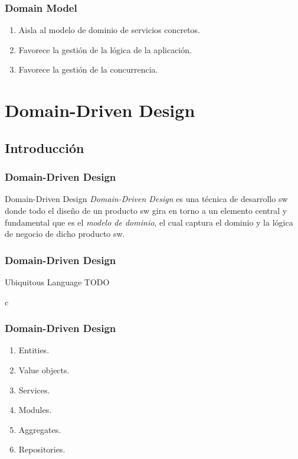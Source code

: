\documentclass[a4paper,slidestop,xcolor=pst,dvips,blue]{beamer}
\begin{document}
\begin{frame}[c]
    \frametitle{Domain Model}
    \begin{enumerate}
        \item<2-> Aisla al modelo de dominio de servicios concretos.
        \item<3-> Favorece la gestión de la lógica de la aplicación.
        \item<3-> Favorece la gestión de la concurrencia.
    \end{enumerate}
\end{frame}

\section{Domain-Driven Design}

\subsection{Introducción}

\begin{frame}[c]
    \frametitle{Domain-Driven Design}
     \begin{block}{Domain-Driven Design}
     \alert{\emph{Domain-Driven Design}} es una técnica de desarrollo sw donde todo el diseño de un producto sw gira en torno a un elemento central y fundamental que es el \emph{modelo de dominio}, el cual captura el dominio y la lógica de negocio de dicho producto sw.
     \end{block}
\end{frame}

\begin{frame}[c]
    \frametitle{Domain-Driven Design}
     \begin{block}{Ubiquitous Language}
     TODO
     \end{block}
\end{frame}

\begin{frame}{c}
   \frametitle{Domain-Driven Design}
   \begin{enumerate}
      \item Entities.
      \item Value objects.
      \item Services.
      \item Modules.
      \item Aggregates.
      \item Repositories.
   \end{enumerate}
\end{frame}
\end{document}
